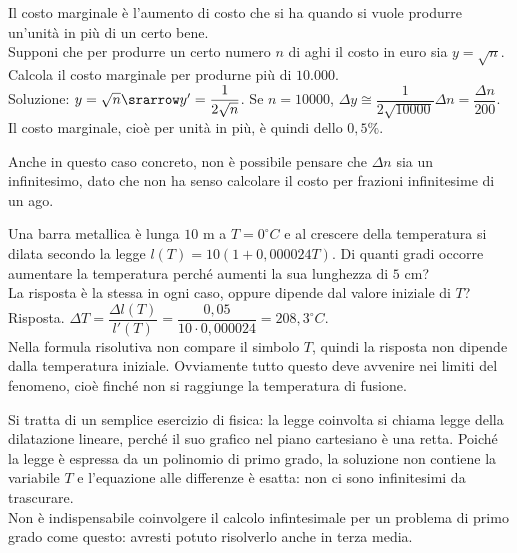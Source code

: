\begin{esempio}
Il costo marginale è l'aumento di costo che si ha quando si vuole produrre 
un'unità in più di un certo bene.\\
Supponi che per produrre un certo numero \(n\) di aghi il costo in euro sia
\(y=\sqrt{n}\). Calcola il costo marginale per produrne più di \(10.000\).\\
Soluzione: \(y=\sqrt{n}\srarrow y'=\dfrac{1}{2\sqrt{n}}\).
Se \(n=10000\), \(\Delta y \cong\dfrac{1}{2\sqrt{10000}}\Delta n=\dfrac{\Delta 
n}{200}\).
Il costo marginale, cioè per unità in più, è quindi dello \(0,5\%\).
\begin{osservazione}
Anche in questo caso concreto, non è possibile pensare che \(\Delta n\) sia 
un infinitesimo, dato che non ha senso calcolare il costo per frazioni 
infinitesime di un ago.
\end{osservazione}
\end{esempio}

\begin{esempio}
Una barra metallica è lunga \(10\) m a \(T=0 ^\circ C\) e al crescere della 
temperatura si dilata secondo la legge \(l(T)=10(1+0,000024T)\). Di quanti 
gradi 
occorre aumentare la temperatura perché aumenti la sua lunghezza di \(5\) 
cm?\\
La risposta è la stessa in ogni caso, oppure dipende dal valore iniziale 
di 
\(T\)?\\
Risposta. \(\Delta T = \dfrac{\Delta l(T)}{l'(T)}=\dfrac{0,05}
{10\cdot 0,000024}=208,3 ^\circ C\).\\
Nella formula risolutiva non compare il simbolo \(T\), quindi la risposta 
non 
dipende dalla temperatura iniziale. Ovviamente tutto questo deve avvenire 
nei 
limiti del fenomeno, cioè finché non si raggiunge la temperatura di 
fusione.
\begin{osservazione}
Si tratta di un semplice esercizio di fisica: la legge coinvolta si chiama
legge della dilatazione lineare, perché il suo grafico nel piano 
cartesiano è una retta. Poiché la legge è espressa da un polinomio di 
primo grado, la soluzione non contiene la variabile \(T\) e l'equazione alle 
differenze è
esatta: non ci sono infinitesimi da trascurare.\\
Non è indispensabile coinvolgere il calcolo infintesimale per un problema 
di
primo grado come questo: avresti potuto risolverlo anche in terza media.
\end{osservazione}
\end{esempio}

